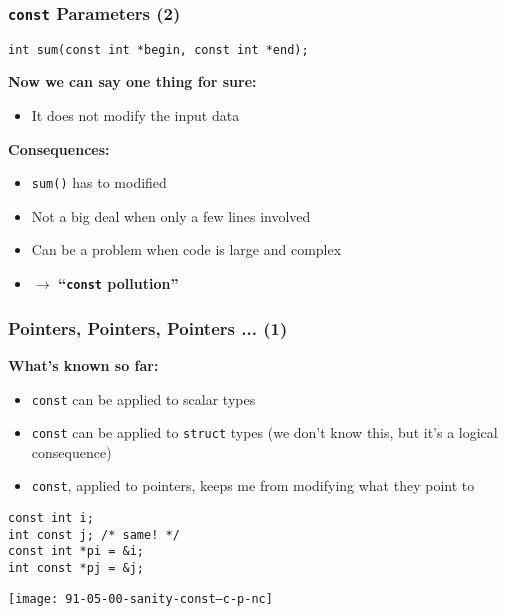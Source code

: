 \begin{frame}[fragile]
  \frametitle{\texttt{const} Parameters (2)}

  \begin{block}{}
\begin{verbatim}
int sum(const int *begin, const int *end);
\end{verbatim}
  \end{block}

  \textbf{Now we can say one thing for sure:}

  \begin{itemize}
  \item It does not modify the input data
  \end{itemize}
  
  \textbf{Consequences:}

  \begin{itemize}
  \item \texttt{sum()} has to modified
  \item Not a big deal when only a few lines involved
  \item Can be a problem when code is large and complex
  \item $\to$ \textbf{``\texttt{const} pollution''}
  \end{itemize}

\end{frame}

\begin{frame}[fragile]
  \frametitle{Pointers, Pointers, Pointers ... (1)}

  \textbf{What's known so far:}

  \begin{itemize}
  \item \texttt{const} can be applied to scalar types
  \item \texttt{const} can be applied to \texttt{struct} types (we
    don't know this, but it's a logical consequence)
  \item \texttt{const}, applied to pointers, keeps me from modifying
    what they point to
  \end{itemize}

  \begin{block}{}
\begin{verbatim}
const int i;
int const j; /* same! */
const int *pi = &i;
int const *pj = &j;
\end{verbatim}
  \end{block}

  \begin{block}{}
    \texttt{[image: 91-05-00-sanity-const--c-p-nc]}
  \end{block}

\end{frame}

